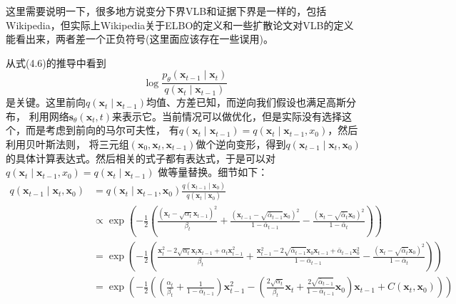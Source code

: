 \documentclass[lang=cn,newtx,10pt,scheme=chinese]{elegantbook}
\begin{document}
这里需要说明一下，很多地方说变分下界VLB和证据下界是一样的，包括Wikipedia，但实际上Wikipedia关于ELBO的定义和一些扩散论文对VLB的定义
能看出来，两者差一个正负符号(这里面应该存在一些误用)。

从式(4.6)的推导中看到
\begin{equation}
\log \frac{p_\theta\left(\mathbf{x}_{t-1} \mid \mathbf{x}_t\right)}{q\left(\mathbf{x}_t \mid \mathbf{x}_{t-1}\right)}
\end{equation}
是关键。这里前向$q(\mathbf{x}_t \mid \mathbf{x}_{t-1})$均值、方差已知，而逆向我们假设也满足高斯分布，
利用网络$\mathbf{s}_\theta(\mathbf{x}_t, t)$来表示它。当前情况可以做优化，但是实际没有选择这个，而是考虑到前向的马尔可夫性，
有$q(\mathbf{x}_t \mid \mathbf{x}_{t-1})=q(\mathbf{x}_t \mid \mathbf{x}_{t-1}, x_0)$，然后利用贝叶斯法则，
将三元组$(\mathbf{x}_0, \mathbf{x}_t, \mathbf{x}_{t-1})$做个逆向变形，得到$q(\mathbf{x}_{t-1} \mid \mathbf{x}_t,\mathbf{x}_0)$
的具体计算表达式。然后相关的式子都有表达式，于是可以对$q(\mathbf{x}_t \mid \mathbf{x}_{t-1}, x_0)=q(\mathbf{x}_t \mid \mathbf{x}_{t-1})$
做等量替换。细节如下：
\begin{equation}
\begin{aligned}
q\left(\mathbf{x}_{t-1} \mid \mathbf{x}_t, \mathbf{x}_0\right) & =q\left(\mathbf{x}_t \mid \mathbf{x}_{t-1}, \mathbf{x}_0\right) \frac{q\left(\mathbf{x}_{t-1} \mid \mathbf{x}_0\right)}{q\left(\mathbf{x}_t \mid \mathbf{x}_0\right)} \\
& \propto \exp \left(-\frac{1}{2}\left(\frac{\left(\mathbf{x}_t-\sqrt{\alpha_t} \mathbf{x}_{t-1}\right)^2}{\beta_t}+\frac{\left(\mathbf{x}_{t-1}-\sqrt{\bar{\alpha}_{t-1}} \mathbf{x}_0\right)^2}{1-\bar{\alpha}_{t-1}}-\frac{\left(\mathbf{x}_t-\sqrt{\bar{\alpha}_t} \mathbf{x}_0\right)^2}{1-\bar{\alpha}_t}\right)\right) \\
& =\exp \left(-\frac{1}{2}\left(\frac{\mathbf{x}_t^2-2 \sqrt{\alpha_t} \mathbf{x}_t \mathbf{x}_{t-1}+\alpha_t \mathbf{x}_{t-1}^2}{\beta_t}+\frac{\mathbf{x}_{t-1}^2-2 \sqrt{\bar{\alpha}_{t-1}} \mathbf{x}_0 \mathbf{x}_{t-1}+\bar{\alpha}_{t-1} \mathbf{x}_0^2}{1-\bar{\alpha}_{t-1}}-\frac{\left(\mathbf{x}_t-\sqrt{\bar{\alpha}_t} \mathbf{x}_0\right)^2}{1-\bar{\alpha}_t}\right)\right) \\
& =\exp \left(-\frac{1}{2}\left(\left(\frac{\alpha_t}{\beta_t}+\frac{1}{1-\bar{\alpha}_{t-1}}\right) \mathbf{x}_{t-1}^2-\left(\frac{2 \sqrt{\alpha_t}}{\beta_t} \mathbf{x}_t+\frac{2 \sqrt{\bar{\alpha}_{t-1}}}{1-\bar{\alpha}_{t-1}} \mathbf{x}_0\right) \mathbf{x}_{t-1}+C\left(\mathbf{x}_t, \mathbf{x}_0\right)\right)\right)
\end{aligned}
\end{equation}
\end{document}
